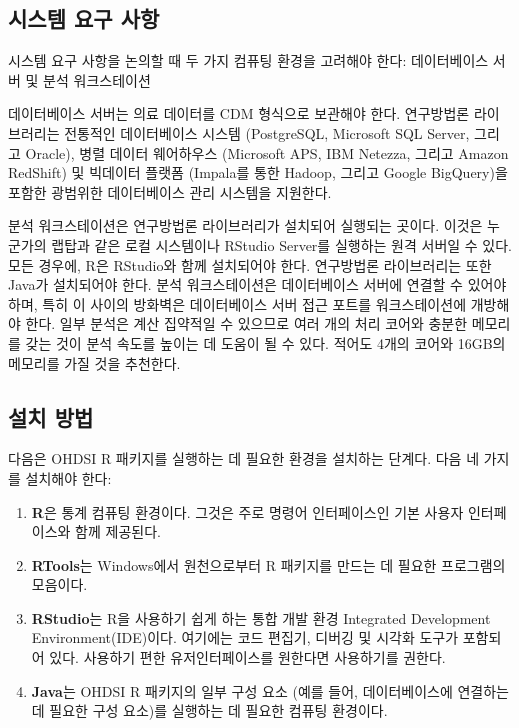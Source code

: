 \documentclass[10.5pt]{book}
\providecommand{\tightlist}{%
  \setlength{\itemsep}{0pt}\setlength{\parskip}{0pt}}
\theoremstyle{definition}
\theoremstyle{definition}
\theoremstyle{definition}
\theoremstyle{remark}
\begin{document}
\subsection{시스템 요구 사항}\label{--}

시스템 요구 사항을 논의할 때 두 가지 컴퓨팅 환경을 고려해야 한다:
데이터베이스 서버 및 분석 워크스테이션 

데이터베이스 서버는 의료 데이터를 CDM 형식으로 보관해야 한다. 연구방법론
라이브러리는 전통적인 데이터베이스 시스템 (PostgreSQL, Microsoft SQL
Server, 그리고 Oracle), 병렬 데이터 웨어하우스 (Microsoft APS, IBM
Netezza, 그리고 Amazon RedShift) 및 빅데이터 플랫폼 (Impala를 통한
Hadoop, 그리고 Google BigQuery)을 포함한 광범위한 데이터베이스 관리
시스템을 지원한다.

분석 워크스테이션은 연구방법론 라이브러리가 설치되어 실행되는 곳이다.
이것은 누군가의 랩탑과 같은 로컬 시스템이나 RStudio Server를 실행하는
원격 서버일 수 있다. 모든 경우에, R은 RStudio와 함께 설치되어야 한다.
연구방법론 라이브러리는 또한 Java가 설치되어야 한다. 분석 워크스테이션은
데이터베이스 서버에 연결할 수 있어야 하며, 특히 이 사이의 방화벽은
데이터베이스 서버 접근 포트를 워크스테이션에 개방해야 한다. 일부 분석은
계산 집약적일 수 있으므로 여러 개의 처리 코어와 충분한 메모리를 갖는
것이 분석 속도를 높이는 데 도움이 될 수 있다. 적어도 4개의 코어와 16GB의
메모리를 가질 것을 추천한다.

\subsection{설치 방법}\label{installR}

다음은 OHDSI R 패키지를 실행하는 데 필요한 환경을 설치하는 단계다. 다음
네 가지를 설치해야 한다: 

\begin{enumerate}
\def\labelenumi{\arabic{enumi}.}
\tightlist
\item
  \textbf{R}은 통계 컴퓨팅 환경이다. 그것은 주로 명령어 인터페이스인
  기본 사용자 인터페이스와 함께 제공된다.
\item
  \textbf{RTools}는 Windows에서 원천으로부터 R 패키지를 만드는 데 필요한
  프로그램의 모음이다.
\item
  \textbf{RStudio}는 R을 사용하기 쉽게 하는 통합 개발 환경 Integrated
  Development Environment(IDE)이다. 여기에는 코드 편집기, 디버깅 및
  시각화 도구가 포함되어 있다. 사용하기 편한 유저인터페이스를 원한다면
  사용하기를 권한다.
\item
  \textbf{Java}는 OHDSI R 패키지의 일부 구성 요소 (예를 들어,
  데이터베이스에 연결하는 데 필요한 구성 요소)를 실행하는 데 필요한
  컴퓨팅 환경이다.
\end{enumerate}
\end{document}
